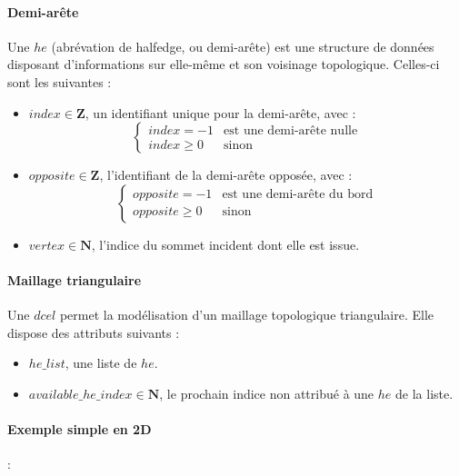 \documentclass[]{article}
\begin{document}
\paragraph{Demi-arête}
Une $he$ (abrévation de halfedge, ou demi-arête) est une structure de données disposant d'informations sur elle-même et son voisinage topologique. Celles-ci sont les suivantes :
\begin{itemize}
	\item $index \in \mathbf{Z}$, un identifiant unique pour la demi-arête, avec :
	      \[
		      \left\{
		      \begin{array}{ll}
			      index = -1   & \mbox{est une demi-arête nulle} \\
			      index \geq 0 & \mbox{sinon}
		      \end{array}
		      \right.
	      \]
	\item $opposite \in \mathbf{Z}$, l'identifiant de la demi-arête opposée, avec :
	      \[
		      \left\{
		      \begin{array}{ll}
			      opposite = -1   & \text{est une demi-arête du bord} \\
			      opposite \geq 0 & \text{sinon}
		      \end{array}
		      \right.
	      \]
	\item $vertex \in \mathbf{N}$, l'indice du sommet incident dont elle est issue.
\end{itemize}

\paragraph{Maillage triangulaire}
Une $dcel$ permet la modélisation d'un maillage topologique triangulaire. Elle dispose des attributs suivants :
\begin{itemize}
	\item $he\_list$, une liste de $he$.
	\item $available\_he\_index \in \mathbf{N}$, le prochain indice non attribué à une $he$ de la liste.
\end{itemize}

\paragraph{Exemple simple en 2D} :
\end{document}

